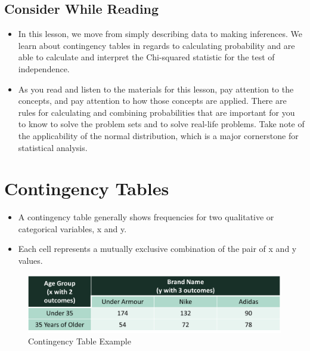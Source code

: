 \documentclass[
  letterpaper,
  DIV=11,
  numbers=noendperiod]{scrreprt}
\providecommand{\tightlist}{%
  \setlength{\itemsep}{0pt}\setlength{\parskip}{0pt}}\usepackage{longtable,booktabs,array}
\begin{document}
\section{Consider While Reading}\label{consider-while-reading-5}

\begin{itemize}
\tightlist
\item
  In this lesson, we move from simply describing data to making
  inferences. We learn about contingency tables in regards to
  calculating probability and are able to calculate and interpret the
  Chi-squared statistic for the test of independence.
\item
  As you read and listen to the materials for this lesson, pay attention
  to the concepts, and pay attention to how those concepts are applied.
  There are rules for calculating and combining probabilities that are
  important for you to know to solve the problem sets and to solve
  real-life problems. Take note of the applicability of the normal
  distribution, which is a major cornerstone for statistical analysis.
\end{itemize}


\chapter{Contingency Tables}\label{contingency-tables}

\begin{itemize}
\tightlist
\item
  A contingency table generally shows frequencies for two qualitative or
  categorical variables, x and y.
\item
  Each cell represents a mutually exclusive combination of the pair of x
  and y values.
\end{itemize}

\begin{figure}[H]

{\centering \includegraphics{Pictures/Ch5/ContTableEx.png}

}

\caption{Contingency Table Example}

\end{figure}%
\end{document}
